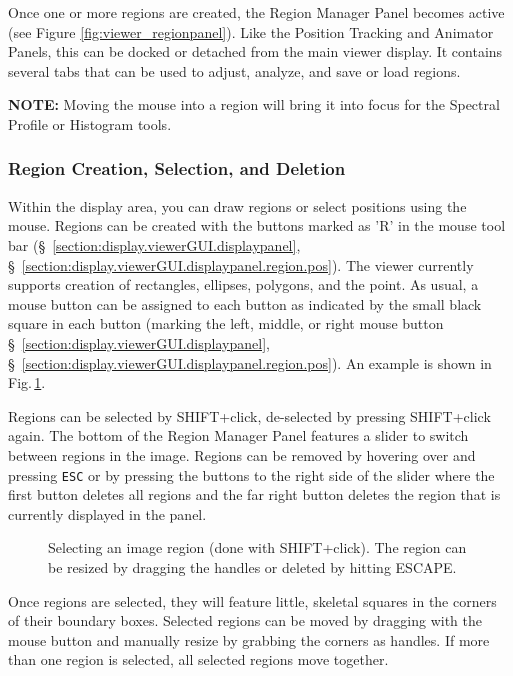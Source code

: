 Once one or more regions are created, the Region Manager Panel becomes
active (see Figure \ref{fig:viewer_regionpanel}). Like the Position Tracking and 
Animator Panels, this can be docked or detached from the main viewer display.
It contains several tabs that can be used to adjust, analyze, and save or load regions.

{\bf NOTE:} Moving the mouse into a region will bring it into focus for the Spectral Profile or
Histogram tools.

\subsubsection{Region Creation, Selection, and Deletion}
\label{section:display.image.region.create}

Within the display area, you can draw regions or select positions using the mouse. 
Regions can be created with the buttons marked as 'R' in the mouse
tool bar (\S~\ref{section:display.viewerGUI.displaypanel},
\S~\ref{section:display.viewerGUI.displaypanel.region.pos}).  The viewer
currently supports creation of rectangles, ellipses, polygons, and the point. As
usual, a mouse button can be assigned to each button as indicated by
the small black square in each button (marking the left, middle, or
right mouse button \S~\ref{section:display.viewerGUI.displaypanel},
\S~\ref{section:display.viewerGUI.displaypanel.region.pos}). An example
is shown in Fig.\,\ref{fig:viewer_regionselected}.

Regions can be selected by SHIFT+click, de-selected by pressing
  SHIFT+click again. The bottom of the
  Region Manager Panel features a slider to switch between regions
in the image. Regions can be removed by hovering over and pressing
{\tt ESC} or by pressing the buttons to the right side of the slider
where the first button deletes all regions and the far right button
deletes the region that is currently displayed in the panel.

\begin{figure}[h!]
\begin{center}
\caption{\label{fig:viewer_regionselected} Selecting an image region (done with SHIFT+click). The region
can be resized by dragging the handles or deleted by hitting ESCAPE.}
\hrulefill
\end{center}
\end{figure}

Once regions are selected, they will feature little, skeletal squares
in the corners of their boundary boxes. Selected regions can be moved by dragging 
with the mouse button and manually resize by grabbing the corners as handles.
If more than one region is selected, all selected regions move together.

